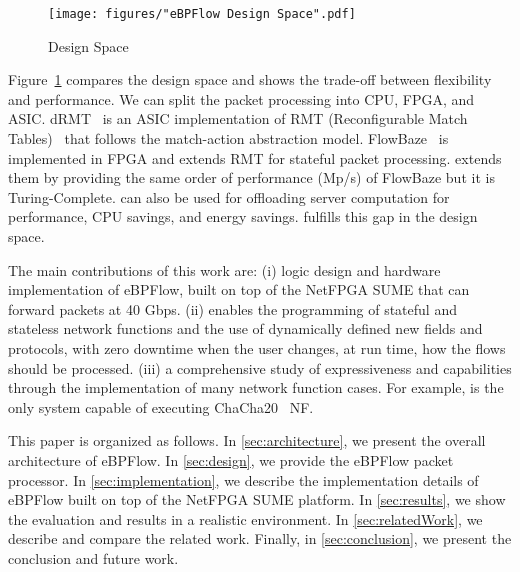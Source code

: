  \begin{figure}[t]
 \centering
\texttt{[image: figures/"eBPFlow Design Space".pdf]}
 \caption{Design Space}
 \label{fig:Comparison}
 \end{figure}

Figure~\ref{fig:Comparison} compares the design space and shows the trade-off between flexibility and performance. 
We can split the packet processing into CPU, FPGA, and ASIC.
dRMT~\cite{chole2017drmt} is an ASIC implementation of RMT (Reconfigurable Match Tables)~\cite{bosshart2013forwarding} that follows the match-action abstraction model. FlowBaze~\cite{FlowBlaze2019} is implemented in FPGA and extends RMT for stateful packet processing.
\system extends them by providing the same order of performance (Mp/s) of FlowBaze but it is Turing-Complete.
\system can also be used for offloading server computation for performance, CPU savings, and energy savings. 
\system fulfills this gap in the design space.






The main contributions of this work are: 
(i) logic design and hardware implementation of eBPFlow, built on top of the NetFPGA SUME that can forward packets at 40 Gbps.
(ii) \system enables the programming of stateful and stateless network functions and the use of dynamically defined new fields and protocols, with zero downtime when the user changes, at run time, how the flows should be processed.
(iii) a comprehensive study of \system expressiveness and capabilities through the implementation of many network function cases. For example, \system is the only system capable of executing ChaCha20~\cite{rfc8439} NF.


This paper is organized as follows. In \textsection\ref{sec:architecture}, we present the overall architecture of eBPFlow. In \textsection\ref{sec:design}, we provide the eBPFlow packet processor. In \textsection\ref{sec:implementation}, we describe the implementation details of eBPFlow built on top of the NetFPGA SUME platform. In \textsection\ref{sec:results}, we show the evaluation and results in a realistic environment. 
In \textsection\ref{sec:relatedWork}, we describe and compare the related work. Finally, in \textsection\ref{sec:conclusion}, we present the conclusion and future work.
